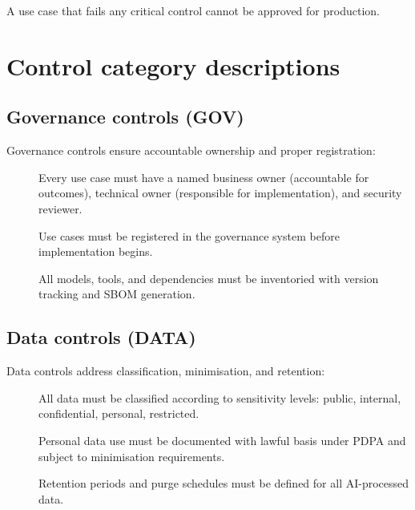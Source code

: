 \begin{tcolorbox}[colback=sgred!5,colframe=sgred!70,title=\faIcon{exclamation-circle} Critical Control Requirement]
A use case that fails any critical control cannot be approved for production.
\end{tcolorbox}

\section{Control category descriptions}

\subsection{Governance controls (GOV)}

Governance controls ensure accountable ownership and proper registration:

\begin{description}
  \item[] Every use case must have a named business owner
        (accountable for outcomes), technical owner (responsible for
        implementation), and security reviewer.
  \item[] Use cases must be registered in the governance
        system before implementation begins.
  \item[] All models, tools, and dependencies must be
        inventoried with version tracking and SBOM generation.
\end{description}

\subsection{Data controls (DATA)}

Data controls address classification, minimisation, and retention:

\begin{description}
  \item[] All data must be classified according to
        sensitivity levels: public, internal, confidential, personal, restricted.
  \item[] Personal data use must be documented with lawful
        basis under PDPA and subject to minimisation requirements.
  \item[] Retention periods and purge schedules must be
        defined for all AI-processed data.
\end{description}

